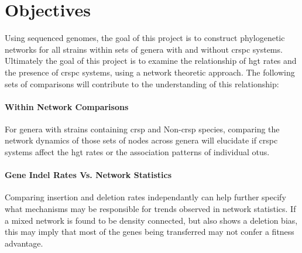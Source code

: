 \section*{\huge Objectives}
Using sequenced genomes, the goal of this project is to construct phylogenetic networks for all strains within sets of genera with and without \ac{crspc} systems.
Ultimately the goal of this project is to examine the relationship of \ac{hgt} rates and the presence of \ac{crspc} systems, using a network theoretic approach. The following sets of comparisons will contribute to the understanding of this relationship:
\paragraph*{Within Network Comparisons}%
For genera with strains containing \ac{crsp} and Non-\ac{crsp} species, comparing the network dynamics of those sets of nodes across genera will elucidate if \ac{crspc} systems affect the \ac{hgt} rates or the association patterns of individual \ac{otu}s.
\paragraph*{Gene Indel Rates Vs. Network Statistics}%
Comparing insertion and  deletion rates independantly can help further specify what mechanisms may be responsible for trends observed in network statistics.
If a mixed network is found to be density connected, but also shows a deletion bias, this may imply that most of the genes being transferred may not confer a fitness advantage.
